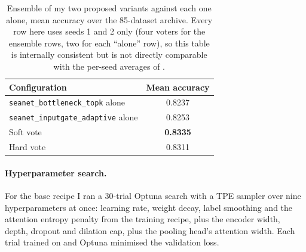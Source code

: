 \begin{table}[htbp]
\caption{Ensemble of my two proposed variants against each one alone, mean accuracy over the
85-dataset \ucr{} archive. Every row here uses seeds 1 and 2 only (four voters for the ensemble
rows, two for each ``alone'' row), so this table is internally consistent but is not directly
comparable with the per-seed averages of .}
\label{tab:ensemble}
\begin{center}
\small
\begin{tabular}{lc}
\toprule
\textbf{Configuration} & \textbf{Mean accuracy} \\
\midrule
\texttt{seanet\_bottleneck\_topk} alone     & 0.8237 \\
\texttt{seanet\_inputgate\_adaptive} alone  & 0.8253 \\
Soft vote                                    & \textbf{0.8335} \\
Hard vote                                    & 0.8311 \\
\bottomrule
\end{tabular}
\end{center}
\end{table}

\paragraph{Hyperparameter search.}
For the base \seanet{} recipe I ran a 30-trial Optuna search \citep{akiba2019optuna} with a TPE
sampler over nine hyperparameters at once: learning rate, weight decay, label smoothing and the
attention entropy penalty from the training recipe, plus the encoder width, depth, dropout and
dilation cap, plus the pooling head's attention width. Each trial trained on \webtraffic{} and
Optuna minimised the validation loss.

